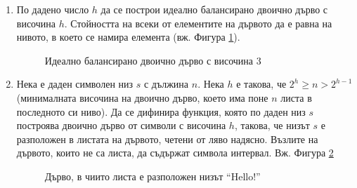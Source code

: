 \begin{enumerate}[resume]

  \item По дадено число $h$ да се построи идеално балансирано двоично дърво с височина $h$. Стойността на всеки от елементите на дървото да е равна на нивото, в което се намира елемента (вж. Фигура \ref{fig:balanced}).

  \begin{figure}
  \centering
  \caption{Идеално балансирано двоично дърво с височина 3}
  \label{fig:balanced}
  \end{figure}

  \item {Нека е даден символен низ $s$ с дължина $n$. Нека $h$ е такова, че $2^h \geq n > 2^{h-1}$ } (минималната височина на двоично дърво, което има поне $n$ листа в последното си ниво). Да се дифинира функция, която по даден низ $s$ построява двоично дърво от символи с височина $h$, такова, че низът $s$ е разположен в листата на дървото, четени от ляво надясно. Възлите на дървото, които не са листа, да съдържат символа интервал. Вж. Фигура \ref{fig:stringleaves}

  \begin{figure}
  \centering
  \caption{Дърво, в чиито листа е разположен низът ``Hello!''}
  \label{fig:stringleaves}
  \end{figure}



\end{enumerate}
